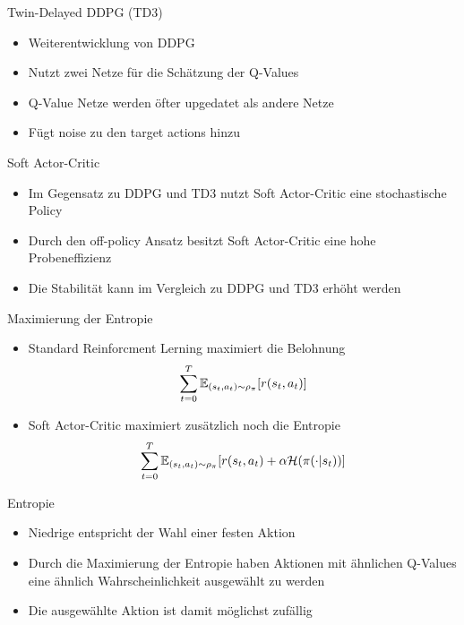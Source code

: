 \begin{frame}{Twin-Delayed DDPG (TD3)}
	\begin{itemize}
		\item Weiterentwicklung von DDPG
		\item Nutzt zwei Netze für die Schätzung der Q-Values
		\item Q-Value Netze werden öfter upgedatet als andere Netze
		\item Fügt noise zu den target actions hinzu
	\end{itemize} 
\end{frame}

\begin{frame}{Soft Actor-Critic}
	\begin{itemize}
		\item Im Gegensatz zu DDPG und TD3 nutzt Soft Actor-Critic eine stochastische Policy
		\item Durch den off-policy Ansatz besitzt Soft Actor-Critic eine hohe Probeneffizienz 
		\item Die Stabilität kann im Vergleich zu DDPG und TD3 erhöht werden 
	\end{itemize} 
\end{frame}

\begin{frame}{Maximierung der Entropie}
	\begin{itemize}
		\item Standard Reinforcment Lerning maximiert die Belohnung
		\begin{equation}
			\sum_{t=0}^T \mathbb{E}_{(s_t,a_t)\sim\rho_\pi}[{\mathnormal{r}(s_t,a_t)}] \notag
		\end{equation}
		\item Soft Actor-Critic maximiert zusätzlich noch die Entropie
		\begin{equation}
			\sum_{t=0}^T \mathbb{E}_{(s_t,a_t)\sim\rho_\pi}[{\mathnormal{r}(s_t,a_t)} + \alpha \mathcal{H}(\pi(\cdot|s_t))] \notag
		\end{equation}
	\end{itemize} 
\end{frame}

\begin{frame}{Entropie}
	\begin{itemize}
		\item Niedrige entspricht der Wahl einer festen Aktion
		\item Durch die Maximierung der Entropie haben Aktionen mit ähnlichen Q-Values eine ähnlich Wahrscheinlichkeit ausgewählt zu werden
		\item Die ausgewählte Aktion ist damit möglichst zufällig
	\end{itemize} 
\end{frame}

